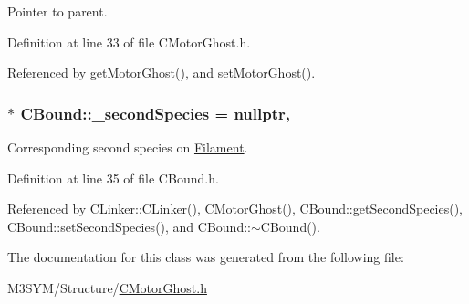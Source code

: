 Pointer to parent. 



Definition at line 33 of file C\+Motor\+Ghost.\+h.



Referenced by get\+Motor\+Ghost(), and set\+Motor\+Ghost().

\hypertarget{classCBound_ae6818ab861d273598a2507be75183e41}{
\subsubsection[{\+\_\+second\+Species}]{$\ast$ C\+Bound\+::\+\_\+second\+Species = nullptr\hspace{0.3cm}{\ttfamily [protected]}, {\ttfamily [inherited]}}}\label{classCBound_ae6818ab861d273598a2507be75183e41}


Corresponding second species on \hyperlink{classFilament}{Filament}. 



Definition at line 35 of file C\+Bound.\+h.



Referenced by C\+Linker\+::\+C\+Linker(), C\+Motor\+Ghost(), C\+Bound\+::get\+Second\+Species(), C\+Bound\+::set\+Second\+Species(), and C\+Bound\+::$\sim$\+C\+Bound().



The documentation for this class was generated from the following file\+:\begin{DoxyCompactItemize}
\item 
M3\+S\+Y\+M/\+Structure/\hyperlink{CMotorGhost_8h}{C\+Motor\+Ghost.\+h}\end{DoxyCompactItemize}
